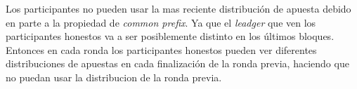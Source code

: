 \documentclass[12pt,addpoints,answers]{exam}
\begin{document}
\begin{questions}
\begin{parts}
    \begin{solution} %
        Los participantes no pueden usar la mas reciente distribución de apuesta debido en parte a
        la propiedad de \textit{common prefix}.
        Ya que el \textit{leadger} que ven los participantes honestos va a ser posiblemente
        distinto en los últimos bloques.
        Entonces en cada ronda los participantes honestos pueden ver diferentes distribuciones de
        apuestas en cada finalización de la ronda previa, haciendo que no puedan usar la distribucion
        de la ronda previa.
    \end{solution}

    \end{parts}


\newpage


~\\

\end{questions}
\end{document}
